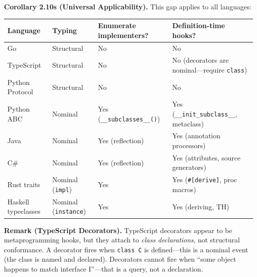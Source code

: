 \textbf{Corollary 2.10s (Universal Applicability).} This gap applies to
all languages:

\small
\begin{longtable}[]{@{}
  >{\raggedright\arraybackslash}p{}
  >{\raggedright\arraybackslash}p{}
  >{\raggedright\arraybackslash}p{}
  >{\raggedright\arraybackslash}p{}@{}}
\toprule\noalign{}
\begin{minipage}[b]{\linewidth}\raggedright
Language
\end{minipage} & \begin{minipage}[b]{\linewidth}\raggedright
Typing
\end{minipage} & \begin{minipage}[b]{\linewidth}\raggedright
Enumerate implementers?
\end{minipage} & \begin{minipage}[b]{\linewidth}\raggedright
Definition-time hooks?
\end{minipage} \\
\midrule\noalign{}
\endhead
\bottomrule\noalign{}
\endlastfoot
Go & Structural & No & No \\
TypeScript & Structural & No & No (decorators are nominal---require
\texttt{class}) \\
Python Protocol & Structural & No & No \\
Python ABC & Nominal & Yes (\texttt{\_\_subclasses\_\_()}) & Yes
(\texttt{\_\_init\_subclass\_\_}, metaclass) \\
Java & Nominal & Yes (reflection) & Yes (annotation processors) \\
C\# & Nominal & Yes (reflection) & Yes (attributes, source
generators) \\
Rust traits & Nominal (\texttt{impl}) & Yes & Yes
(\texttt{\#{[}derive{]}}, proc macros) \\
Haskell typeclasses & Nominal (\texttt{instance}) & Yes & Yes (deriving,
TH) \\
\end{longtable}

\textbf{Remark (TypeScript Decorators).} TypeScript decorators appear to
be metaprogramming hooks, but they attach to \emph{class declarations},
not structural conformance. A decorator fires when \texttt{class\ C} is
defined---this is a nominal event (the class is named and declared).
Decorators cannot fire when ``some object happens to match interface
I''---that is a query, not a declaration.

